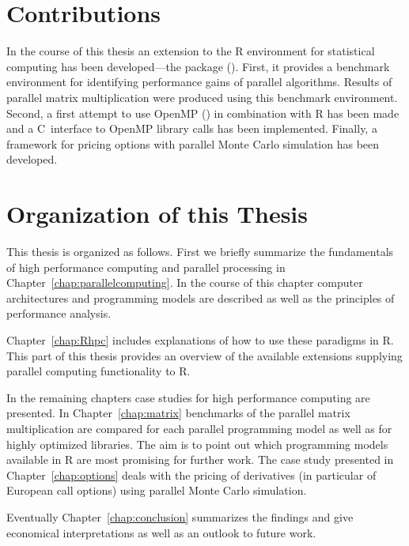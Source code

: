 \section{Contributions}
In the course of this thesis an extension to the R
environment for statistical computing has been developed---the
 package (\cite{theussl07paRc}). First, it provides a
benchmark environment for 
identifying performance gains of parallel algorithms. Results of
parallel matrix multiplication were produced using this benchmark
environment. Second, a first
attempt to use OpenMP (\cite{openMP05}) in combination with R has been
made and a 
C~interface to OpenMP library calls has been implemented. Finally,
a framework for pricing options with parallel Monte Carlo simulation
has been developed.
 
\section{Organization of this Thesis}

This thesis is organized as follows. First we briefly summarize the
fundamentals of high performance computing and parallel processing in
Chapter~\ref{chap:parallelcomputing}. In the course of this chapter
computer architectures and programming models are described as well as the
principles of performance analysis.

Chapter~\ref{chap:Rhpc} includes explanations of how to use these
paradigms in R. This part of
this thesis provides an overview of the
available extensions supplying parallel computing functionality to R.

In the remaining chapters case studies for high performance
computing are presented. In Chapter~\ref{chap:matrix}
benchmarks of the parallel matrix multiplication are compared for each
parallel 
programming model as well as for highly optimized libraries. The aim
is to point out which programming models available in R are most
promising for further work.
The case study presented in Chapter~\ref{chap:options} deals with the
pricing of derivatives (in particular of European call options) using
parallel Monte Carlo simulation. 

Eventually Chapter~\ref{chap:conclusion} summarizes
the findings and give economical interpretations as well as an outlook
to future work.

